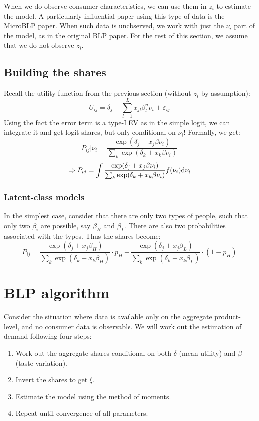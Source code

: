 When we do observe consumer characteristics, we can use them in $z_i$ to estimate the model. A particularly influential paper using this type of data is the MicroBLP paper. When such data is unobserved, we work with just the $\nu_i$ part of the model, as in the original BLP paper. For the rest of this section, we assume that we do not observe $z_i$.

\subsection{Building the shares}

Recall the utility function from the previous section (without $z_i$ by assumption): $$ U_{ij} = \delta_j + \sum_{l=1}^L x_{jl}\beta_l^u \nu_i  + \varepsilon_{ij} $$ Using the fact the error term is a type-I EV as in the simple logit, we can integrate it and get logit shares, but only conditional on $\nu_i$! Formally, we get: $$ P_{ij}|\nu_i = \frac{\exp(\delta_j + x_{j}\beta \nu_i )}{\sum_k \exp(\delta_k + x_{k}\beta \nu_i )} $$ $$ \Rightarrow P_{ij} = \int \frac{\exp(\delta_j + x_{j}\beta \nu_i )}{\sum_k \exp(\delta_k + x_{k}\beta \nu_i )} f(\nu_i)\mathrm{d} \nu_i $$

\subsubsection{Latent-class models}

In the simplest case, consider that there are only two types of people, such that only two $\beta_i$ are possible, say $\beta_H$ and $\beta_L$. There are also two probabilities associated with the types. Thus the shares become: $$ P_{ij} = \frac{\exp(\delta_j + x_{j}\beta_H )}{\sum_k \exp(\delta_k + x_{k}\beta_H )} \cdot p_H + \frac{\exp(\delta_j + x_{j}\beta_L )}{\sum_k \exp(\delta_k + x_{k}\beta_L )} \cdot (1 - p_H) $$

\section{BLP algorithm}

Consider the situation where data is available only on the aggregate product-level, and no consumer data is observable. We will work out the estimation of demand following four steps:\begin{enumerate}
\item Work out the aggregate shares conditional on both $\delta$ (mean utility) and $\beta$ (taste variation).
\item Invert the shares to get $\xi$.
\item Estimate the model using the method of moments.
\item Repeat until convergence of all parameters.
\end{enumerate}

